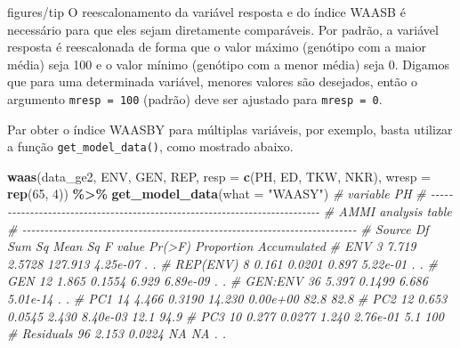 \documentclass[
]{book}
\newenvironment{Shaded}{\begin{snugshade}}{\end{snugshade}}
\newcommand{\CommentTok}[1]{\textcolor[rgb]{0.56,0.35,0.01}{\textit{#1}}}
\newcommand{\DataTypeTok}[1]{\textcolor[rgb]{0.13,0.29,0.53}{#1}}
\newcommand{\DecValTok}[1]{\textcolor[rgb]{0.00,0.00,0.81}{#1}}
\newcommand{\KeywordTok}[1]{\textcolor[rgb]{0.13,0.29,0.53}{\textbf{#1}}}
\newcommand{\NormalTok}[1]{#1}
\newcommand{\OperatorTok}[1]{\textcolor[rgb]{0.81,0.36,0.00}{\textbf{#1}}}
\newcommand{\StringTok}[1]{\textcolor[rgb]{0.31,0.60,0.02}{#1}}
\numberwithin{equation}{section}
\newcommand{\indt}[1]{\index{#1|ST}}
\newenvironment{dica}
  {\begin{customBlockImage}[colframe=customBlue, title=Dica]{figures/tip}}
  {\end{customBlockImage}}
\begin{document}
\indt{Dicas}
\begin{dica}
O reescalonamento da variável resposta e do índice WAASB é necessário para que eles sejam diretamente comparáveis. Por padrão, a variável resposta é reescalonada de forma que o valor máximo (genótipo com a maior média) seja 100 e o valor mínimo (genótipo com a menor média) seja 0. Digamos que para uma determinada variável, menores valores são desejados, então o argumento \texttt{mresp\ =\ 100} (padrão) deve ser ajustado para \texttt{mresp\ =\ 0}.
\end{dica}

Par obter o índice WAASBY para múltiplas variáveis, por exemplo, basta utilizar a função \texttt{get\_model\_data()}, como mostrado abaixo.

\begin{Shaded}
\begin{Highlighting}[]
\KeywordTok{waas}\NormalTok{(data\_ge2, ENV, GEN, REP,}
     \DataTypeTok{resp =} \KeywordTok{c}\NormalTok{(PH, ED, TKW, NKR),}
     \DataTypeTok{wresp =} \KeywordTok{rep}\NormalTok{(}\DecValTok{65}\NormalTok{, }\DecValTok{4}\NormalTok{)) }\OperatorTok{\%\textgreater{}\%}
\StringTok{ }\KeywordTok{get\_model\_data}\NormalTok{(}\DataTypeTok{what =} \StringTok{"WAASY"}\NormalTok{)}
\CommentTok{\# variable PH }
\CommentTok{\# {-}{-}{-}{-}{-}{-}{-}{-}{-}{-}{-}{-}{-}{-}{-}{-}{-}{-}{-}{-}{-}{-}{-}{-}{-}{-}{-}{-}{-}{-}{-}{-}{-}{-}{-}{-}{-}{-}{-}{-}{-}{-}{-}{-}{-}{-}{-}{-}{-}{-}{-}{-}{-}{-}{-}{-}{-}{-}{-}{-}{-}{-}{-}{-}{-}{-}{-}{-}{-}{-}{-}{-}{-}{-}{-}}
\CommentTok{\# AMMI analysis table}
\CommentTok{\# {-}{-}{-}{-}{-}{-}{-}{-}{-}{-}{-}{-}{-}{-}{-}{-}{-}{-}{-}{-}{-}{-}{-}{-}{-}{-}{-}{-}{-}{-}{-}{-}{-}{-}{-}{-}{-}{-}{-}{-}{-}{-}{-}{-}{-}{-}{-}{-}{-}{-}{-}{-}{-}{-}{-}{-}{-}{-}{-}{-}{-}{-}{-}{-}{-}{-}{-}{-}{-}{-}{-}{-}{-}{-}{-}}
\CommentTok{\#     Source  Df Sum Sq Mean Sq F value   Pr(\textgreater{}F) Proportion Accumulated}
\CommentTok{\#        ENV   3  7.719  2.5728 127.913 4.25e{-}07          .           .}
\CommentTok{\#   REP(ENV)   8  0.161  0.0201   0.897 5.22e{-}01          .           .}
\CommentTok{\#        GEN  12  1.865  0.1554   6.929 6.89e{-}09          .           .}
\CommentTok{\#    GEN:ENV  36  5.397  0.1499   6.686 5.01e{-}14          .           .}
\CommentTok{\#        PC1  14  4.466  0.3190  14.230 0.00e+00       82.8        82.8}
\CommentTok{\#        PC2  12  0.653  0.0545   2.430 8.40e{-}03       12.1        94.9}
\CommentTok{\#        PC3  10  0.277  0.0277   1.240 2.76e{-}01        5.1         100}
\CommentTok{\#  Residuals  96  2.153  0.0224      NA       NA          .           .}

\end{Highlighting}
\end{Shaded}
\end{document}
